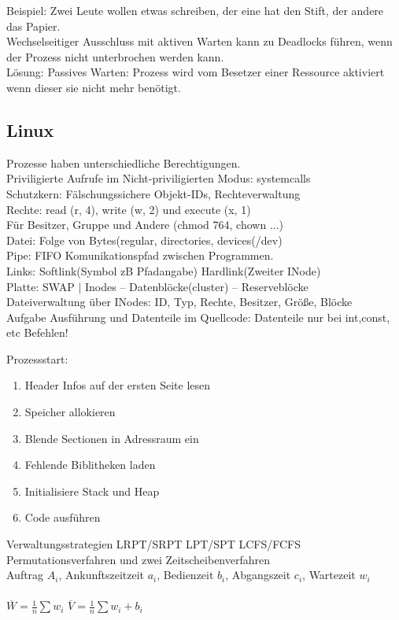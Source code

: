 \documentclass[fs]{latex4ei}
\begin{document}
\begin{multicols}{4}
Beispiel: Zwei Leute wollen etwas schreiben, der eine hat den Stift, der andere das Papier.\\
Wechselseitiger Ausschluss mit aktiven Warten kann zu Deadlocks führen, wenn der Prozess nicht unterbrochen werden kann.\\
Lösung: Passives Warten: Prozess wird vom Besetzer einer Ressource aktiviert wenn dieser sie nicht mehr benötigt.\\


\subsection{Linux}
Prozesse haben unterschiedliche Berechtigungen.\\
Priviligierte Aufrufe im Nicht-priviligierten Modus: systemcalls\\
Schutzkern: Fälschungssichere Objekt-IDs, Rechteverwaltung\\
Rechte: read (r, 4), write (w, 2) und execute (x, 1)\\
Für Besitzer, Gruppe und Andere (chmod 764, chown ...)\\
Datei: Folge von Bytes(regular, directories, devices(/dev)\\
Pipe: FIFO Komunikationspfad zwischen Programmen.\\
Links: Softlink(Symbol zB Pfadangabe) Hardlink(Zweiter INode)\\
Platte: SWAP $|$ Inodes -- Datenblöcke(cluster) -- Reserveblöcke\\
Dateiverwaltung über INodes: ID, Typ, Rechte, Besitzer, Größe, Blöcke\\
Aufgabe Ausführung und Datenteile im Quellcode: Datenteile nur bei int,const, etc Befehlen!

Prozessstart:
\begin{enumerate}
	\item Header Infos auf der ersten Seite lesen
	\item Speicher allokieren
	\item Blende Sectionen in Adressraum ein
	\item Fehlende Biblitheken laden
	\item Initialisiere Stack und Heap
	\item Code ausführen
\end{enumerate}

Verwaltungsstrategien LRPT/SRPT \quad LPT/SPT \quad LCFS/FCFS\\
Permutationsverfahren und zwei Zeitscheibenverfahren\\
Auftrag $A_i$, Ankunftszeitzeit $a_i$, Bedienzeit $b_i$, Abgangszeit $c_i$, Wartezeit $w_i$\\
\\
$\overline W = \frac{1}{n} \sum w_i$ \quad $\overline V = \frac{1}{n} \sum w_i + b_i$\\



\end{multicols}
\end{document}
